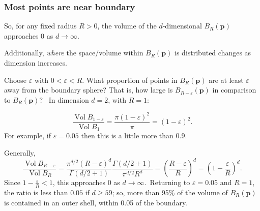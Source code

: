 \documentclass[smaller]{beamer}
\theoremstyle{example}
\begin{document}
\begin{frame}
    \frametitle{Most points are near boundary}
    So, for any fixed radius $R>0$, the volume of the $d$-dimensional $B_R(\textbf{p})$ approaches $0$ as $d\to\infty$.  

    \pause
    Additionally, \textit{where} the space/volume within $B_R(\textbf{p})$ is distributed changes as dimension increases. 

    \pause
    Choose $\varepsilon$ with $0 < \varepsilon < R$. What proportion of points in $B_R(\textbf{p})$ are at least $\varepsilon$ away from the boundary sphere? That is, how large is $B_{R-\varepsilon}(\textbf{p})$ in comparison to $B_{R}(\textbf{p})$? \pause \ In dimension $d=2$, with $R=1$:

    \[\frac{\operatorname{Vol}B_{1-\varepsilon}}{\operatorname{Vol}B_{1}} = 
    \frac{\pi(1-\varepsilon)^2}{\pi} = (1-\varepsilon)^2.
    \]
    \pause
    For example, if $\varepsilon =0.05$ then this is a little more than $0.9$.

    \pause
    Generally, 
    \[\frac{\operatorname{Vol}B_{R-\varepsilon}}{\operatorname{Vol}B_{R}} = 
    \frac{\pi^{d/2}(R-\varepsilon)^d}{\Gamma(d/2 + 1)}\frac{\Gamma(d/2+1)}{\pi^{d/2}R^d} = \left(\frac{R-\varepsilon}{R}\right)^d = \left(1 - \frac{\varepsilon}{R}\right)^d.
    \]
    Since $1-\frac{\varepsilon}{R} < 1$, this approaches $0$ as $d\to\infty$.\pause\  Returning to $\varepsilon=0.05$ and $R=1$, the ratio is less than $0.05$ if $d \ge 59$; so, more than 95\% of the volume of $B_{R}(\textbf{p})$ is contained in an outer shell, within 0.05 of the boundary.
\end{frame}
\end{document}
